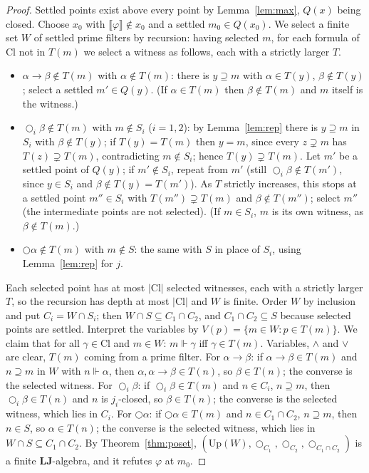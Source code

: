 \documentclass[11pt]{amsart}
\theoremstyle{definition}
\newcommand{\Up}{\mathrm{Up}}
\newcommand{\LLJ}{\mathbf{LJ}}
\newcommand{\lax}{\bigcirc}
\begin{document}
\begin{proof}
Settled points exist above every point by Lemma~\ref{lem:max}, $Q(x)$
being closed. Choose $x_0$ with $\llbracket\varphi\rrbracket\notin x_0$ and a
settled $m_0\in Q(x_0)$. We select a finite set $W$ of settled prime filters by
recursion: having selected $m$, for each formula of $\mathrm{Cl}$ not in
$T(m)$ we select a witness as follows, each with a strictly larger $T$.
\begin{itemize}
\item $\alpha\to\beta\notin T(m)$ with $\alpha\notin T(m)$: there is
$y\supseteq m$ with $\alpha\in T(y)$, $\beta\notin T(y)$; select a settled
$m'\in Q(y)$. (If $\alpha\in T(m)$ then $\beta\notin T(m)$ and $m$ itself is
the witness.)
\item $\lax_i\beta\notin T(m)$ with $m\notin S_i$ ($i=1,2$): by
Lemma~\ref{lem:rep} there is $y\supseteq m$ in $S_i$ with $\beta\notin T(y)$;
if $T(y)=T(m)$ then $y=m$, since every $z\supsetneq m$ has
$T(z)\supsetneq T(m)$, contradicting $m\notin S_i$; hence $T(y)\supsetneq T(m)$. Let $m'$ be a settled point of $Q(y)$;
if $m'\notin S_i$, repeat from $m'$ (still $\lax_i\beta\notin T(m')$, since
$y\in S_i$ and $\beta\notin T(y)=T(m')$). As $T$ strictly increases, this stops
at a settled point $m''\in S_i$ with $T(m'')\supsetneq T(m)$ and
$\beta\notin T(m'')$; select $m''$ (the intermediate points are not
selected). (If $m\in S_i$, $m$ is its own witness, as $\beta\notin T(m)$.)
\item $\lax\alpha\notin T(m)$ with $m\notin S$: the same with $S$ in place of
$S_i$, using Lemma~\ref{lem:rep} for $j$.
\end{itemize}
Each selected point has at most $|\mathrm{Cl}|$ selected witnesses, each
with a strictly larger $T$, so the recursion has depth at most $|\mathrm{Cl}|$
and $W$ is finite. Order $W$ by inclusion and put
$C_i=W\cap S_i$; then $W\cap S\subseteq C_1\cap C_2$, and $C_1\cap C_2\subseteq S$
because selected points are settled. Interpret the variables by
$V(p)=\{m\in W:p\in T(m)\}$. We claim that for all $\gamma\in\mathrm{Cl}$ and
$m\in W$: $m\Vdash\gamma$ iff $\gamma\in T(m)$. Variables, $\wedge$ and $\vee$
are clear, $T(m)$ coming from a prime filter. For $\alpha\to\beta$: if
$\alpha\to\beta\in T(m)$ and $n\supseteq m$ in $W$ with $n\Vdash\alpha$, then
$\alpha,\alpha\to\beta\in T(n)$, so $\beta\in T(n)$; the converse is the
selected witness. For $\lax_i\beta$: if $\lax_i\beta\in T(m)$ and
$n\in C_i$, $n\supseteq m$, then $\lax_i\beta\in T(n)$ and $n$ is $j_i$-closed,
so $\beta\in T(n)$; the converse is the selected witness, which lies in $C_i$.
For $\lax\alpha$: if $\lax\alpha\in T(m)$ and $n\in C_1\cap C_2$,
$n\supseteq m$, then $n\in S$, so $\alpha\in T(n)$; the converse is the
selected witness, which lies in $W\cap S\subseteq C_1\cap C_2$. By
Theorem~\ref{thm:poset}, $(\Up(W),\lax_{C_1},\lax_{C_2},\lax_{C_1\cap C_2})$
is a finite $\LLJ$-algebra, and it refutes $\varphi$ at $m_0$.


\end{proof}
\end{document}
